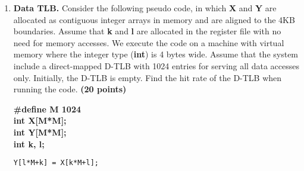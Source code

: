 \documentclass[a4paper, 11pt]{exam}
\begin{document}
\begin{enumerate}

\item \textbf{Data TLB.}
Consider the following  pseudo code, in which \textbf{X} and \textbf{Y} are allocated as contiguous integer arrays in memory and are aligned to the 4KB boundaries.
Assume that \textbf{k} and \textbf{l} are allocated in the register file with no need for memory accesses.
We execute the code on a machine with virtual memory where the integer type (\textbf{int}) is 4 bytes wide.
Assume that the system include a direct-mapped D-TLB with 1024 entries for serving all data accesses only.
Initially, the D-TLB is empty.
Find the hit rate of the D-TLB when running the code.
\textbf{(20 points)}
\begin{algorithm}
	\textbf{\#define M 1024} \\
	\textbf{int X[M*M];} \\
	\textbf{int Y[M*M];} \\
	\textbf{int k, l;}
	\begin{algorithmic}	
		\STATE \texttt{Y[l*M+k] = X[k*M+l];}
		\ENDFOR
		\ENDFOR
	\end{algorithmic}
\end{algorithm}


\end{enumerate}
\end{document}
